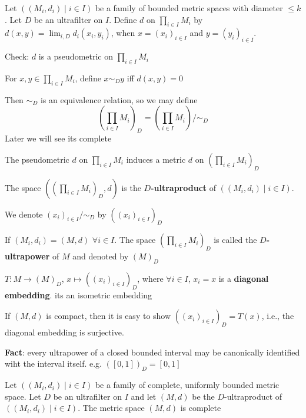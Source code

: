 \documentclass[11pt]{article}
\begin{document}
\begin{definition}[]
Let \(((M_i,d_i)\mid i\in I)\) be a family of bounded metric spaces with diameter \(\le k\).
Let \(D\) be an ultrafilter on \(I\). Define \(d\) on \(\prod_{i\in I}M_i\)
by \(d(x,y)=\lim_{i,D}d_i(x_i,y_i)\), when \(x=(x_i)_{i\in I}\) and \(y=(y_i)_{i\in I}\).

Check: \(d\) is a pseudometric on \(\prod_{i\in I}M_i\)

For \(x,y\in\prod_{i\in I}M_i\), define \(x\sim_Dy\) iff \(d(x,y)=0\)

Then \(\sim_D\) is an equivalence relation, so we may define
\begin{equation*}
 \left(\prod_{i\in I}M_i\right)_D=\left(\prod_{i\in I}M_i\right)/\sim_D
\end{equation*}
Later we will see its complete

The pseudometric \(d\) on \(\prod_{i\in I}M_i\) induces a metric \(d\)
on \((\prod_{i\in I}M_i)_D\)

The space \(((\prod_{i\in I}M_i)_D,d)\) is the \textbf{\(D\)-ultraproduct} of \(((M_i,d_i)\mid i\in I)\).

We denote \((x_i)_{i\in I}/\sim_D\) by \(((x_i)_{i\in I})_D\)

If \((M_i,d_i)=(M,d)\) \(\forall i\in I\). The space \((\prod_{i\in I}M_i)_D\) is called the
\textbf{\(D\)-ultrapower} of \(M\) and denoted by \((M)_D\)

\(T:M\to(M)_D\), \(x\mapsto((x_i)_{i\in I})_D\), where \(\forall i\in I\), \(x_i=x\) is a \textbf{diagonal
embedding}. its an isometric embedding
\end{definition}

If \((M,d)\) is compact, then it is easy to show \(((x_i)_{i\in I})_D=T(x)\), i.e., the diagonal
embedding is surjective.

\textbf{Fact}: every ultrapower of a closed bounded interval may be canonically identified wiht the
 interval itself. e.g. \(([0,1])_D=[0,1]\)

\begin{proposition}[]
\label{propB.10}
Let \(((M_i,d_i)\mid i\in I)\) be a family of complete, uniformly bounded metric space.
Let \(D\) be an ultrafilter on \(I\) and let \((M,d)\) be the \(D\)-ultraproduct
of \(((M_i,d_i)\mid i\in I)\). The metric space \((M,d)\) is complete
\end{proposition}
\end{document}
